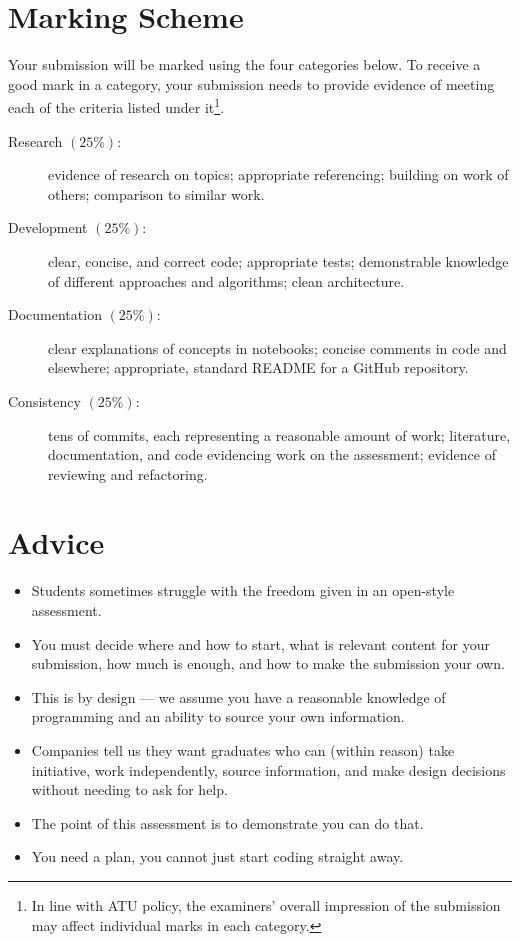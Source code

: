 \documentclass{iansnotes}
\begin{document}
\section{Marking Scheme}
Your submission will be marked using the four categories below.
To receive a good mark in a category, your submission needs to provide evidence of meeting each of the criteria listed under it\footnote{In line with ATU policy, the examiners' overall impression of the submission may affect individual marks in each category.}.

\begin{description}
  \item[Research $(25\%)$:] evidence of research on topics; appropriate referencing; building on work of others; comparison to similar work.
  \item[Development $(25\%)$:] clear, concise, and correct code; appropriate tests; demonstrable knowledge of different approaches and algorithms; clean architecture.
  \item[Documentation $(25\%)$:] clear explanations of concepts in notebooks; concise comments in code and elsewhere; appropriate, standard README for a GitHub repository.
  \item[Consistency $(25\%)$:] tens of commits, each representing a reasonable amount of work; literature, documentation, and code evidencing work on the assessment; evidence of reviewing and refactoring.
\end{description}

 
\section{Advice}

\begin{itemize}
  \item Students sometimes struggle with the freedom given in an open-style assessment.
  \item You must decide where and how to start, what is relevant content for your submission, how much is enough, and how to make the submission your own.
  \item This is by design --- we assume you have a reasonable knowledge of programming and an ability to source your own information.
  \item Companies tell us they want graduates who can (within reason) take initiative, work independently, source information, and make design decisions without needing to ask for help.
  \item The point of this assessment is to demonstrate you can do that.
  \item You need a plan, you cannot just start coding straight away.
\end{itemize}
\end{document}
